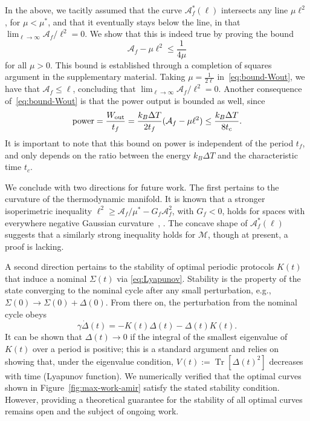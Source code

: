 \documentclass[
 reprint,
superscriptaddress,
 amsmath,amssymb,prl
 aps
]{revtex4-2}
\newcommand{\Area}{{\mathcal A}}
\newcommand{\op}[1]{\operatorname{#1}}
\newcommand{\trace}{\op{Tr}}
\begin{document}
In the above, we tacitly assumed that the curve $\Area_f^*(\ell)$  intersects any line $\mu\ell^2$, for $\mu < \mu^*$, and that it eventually stays below the line, in that  $\lim_{\ell \to \infty}\Area_f/\ell^2 = 0$. We show that this is indeed true by proving the bound
\begin{equation}\label{eq:bound-Wout}
    \Area_f  -\mu \ell^2\leq \frac{1}{4\mu}
\end{equation}
for all $\mu>0$. 
This bound is established through a completion of squares argument in the supplementary material. Taking $\mu = \frac{1}{2\ell}$ in~\eqref{eq:bound-Wout}, we have that $\Area_f \leq \ell$, concluding that $\lim_{\ell \to \infty}\Area_f/\ell^2 = 0$. 
Another consequence of~\eqref{eq:bound-Wout} is that the power output is bounded as well, since
\begin{equation*}
    \text{power} = \frac{W_{\rm out}}{t_f} = \frac{k_B \Delta T}{2t_f}(\Area_f - \mu \ell^2) \leq \frac{k_B\Delta T}{8t_c}.
\end{equation*}
It is important to note that this bound on power is independent of the period $t_f$, and only depends on the ratio between the energy $k_B \Delta T$ and the characteristic time $t_c$.  





We conclude with two directions for future work. The first pertains to the curvature of the thermodynamic manifold. It is known that a stronger isoperimetric inequality $\ell^2 \geq  \Area_f/\mu^* - G_f \Area_f^2$, with $G_f<0$, holds for spaces with everywhere negative Gaussian curvature~\cite{morgan1998riemannian}, \cite[page 1206]{osserman1978isoperimetric}. The concave shape of $\Area^*_f(\ell)$ suggests that a similarly strong inequality holds for $\mathcal M$, though at present, a proof is lacking.

A second direction pertains to the stability of optimal periodic protocols $K(t)$ that induce a nominal $\Sigma(t)$ via  \eqref{eq:Lyapunov}. Stability is the property of the state converging to the nominal cycle after any small perturbation, e.g.,  $\Sigma(0)\to \Sigma(0) + \Delta(0)$. From there on, the perturbation from the nominal cycle obeys
\[
\gamma \dot \Delta(t)=-K(t)\Delta(t)-\Delta(t)K(t).
\]
It can be shown that $\Delta(t)\to 0$  if the integral of the smallest eigenvalue of $K(t)$ over a period is positive; this is a standard argument and relies on showing that, under the eigenvalue condition,  $V(t):=\trace[\Delta(t)^2]$ decreases with time (Lyapunov function). We numerically verified that the optimal curves shown in Figure~\ref{fig:max-work-amir} satisfy the stated stability condition.  However, providing a theoretical guarantee for the stability of all optimal curves remains open and the subject of ongoing work. 
\end{document}
